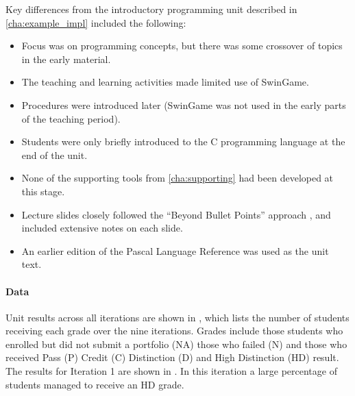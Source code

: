 Key differences from the introductory programming unit described in \cref{cha:example_impl} included the following:
\begin{itemize}[noitemsep,nolistsep]
	\item Focus was on programming concepts, but there was some crossover of topics in the early material.
	\item The teaching and learning activities made limited use of SwinGame.
	\item Procedures were introduced later (SwinGame was not used in the early parts of the teaching period). 
	\item Students were only briefly introduced to the C programming language at the end of the unit.
	\item None of the supporting tools from \cref{cha:supporting} had been developed at this stage.
	\item Lecture slides closely followed the ``Beyond Bullet Points'' approach \cite{Atkinson:2007}, and included extensive notes on each slide.
	\item An earlier edition of the Pascal Language Reference \cite{FPC:2013lang} was used as the unit text.
\end{itemize}

\paragraph{Data} %

Unit results across all iterations are shown in , which lists the number of students receiving each grade over the nine iterations. Grades include those students who enrolled but did not submit a portfolio (NA) those who failed (N) and those who received Pass (P) Credit (C) Distinction (D) and High Distinction (HD) result. The results for Iteration 1 are shown in . In this iteration a large percentage of students managed to receive an HD grade.

